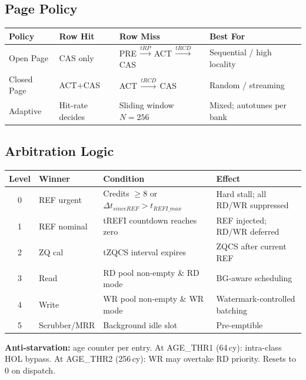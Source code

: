 \documentclass[10pt,a4paper]{article}
\newcommand{\Th}[1]{\cellcolor{thbg}\textbf{\small\color{acc1}#1}}
\newcommand{\RA}{\rowcolor{white}}
\newcommand{\RB}{\rowcolor{altbg}}
\begin{document}
\subsection{Page Policy}

\begin{center}
\begin{tabularx}{\linewidth}{@{} l l l X @{}}
\toprule
\Th{Policy} & \Th{Row Hit} & \Th{Row Miss} & \Th{Best For} \\
\midrule
\RA Open Page  & CAS only     & PRE\,$\xrightarrow{tRP}$\,ACT\,$\xrightarrow{tRCD}$\,CAS & Sequential / high locality \\
\RB Closed Page& ACT$+$CAS    & ACT\,$\xrightarrow{tRCD}$\,CAS                           & Random / streaming \\
\RA Adaptive   & Hit-rate decides & Sliding window $N=256$ & Mixed; autotunes per bank \\
\bottomrule
\end{tabularx}
\end{center}

\subsection{Arbitration Logic}

\begin{center}
\begin{tabularx}{\linewidth}{@{} c l l X @{}}
\toprule
\Th{Level} & \Th{Winner} & \Th{Condition} & \Th{Effect} \\
\midrule
\RA 0 & REF urgent   & Credits $\geq 8$ or $\Delta t_{since REF}>t_{REFI\_max}$ & Hard stall; all RD/WR suppressed \\
\RB 1 & REF nominal  & tREFI countdown reaches zero    & REF injected; RD/WR deferred \\
\RA 2 & ZQ cal       & tZQCS interval expires          & ZQCS after current REF \\
\RB 3 & Read         & RD pool non-empty \& RD mode    & BG-aware scheduling \\
\RA 4 & Write        & WR pool non-empty \& WR mode    & Watermark-controlled batching \\
\RB 5 & Scrubber/MRR & Background idle slot            & Pre-emptible \\
\bottomrule
\end{tabularx}
\end{center}

\textbf{Anti-starvation:} age counter per entry. At AGE\_THR1 (64\,cy): intra-class HOL bypass.
At AGE\_THR2 (256\,cy): WR may overtake RD priority. Resets to 0 on dispatch.
\end{document}
